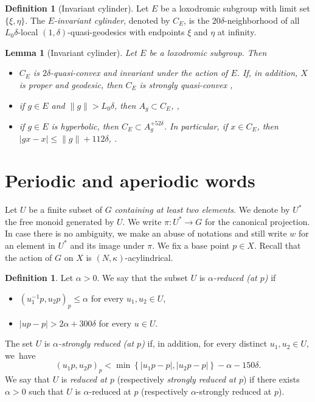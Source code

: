 \documentclass[11pt]{article}
\theoremstyle{plain}
\newtheorem{lem}[thm]{Lemma}
\theoremstyle{definition}
\newtheorem{df}[thm]{Definition}
\begin{document}
\begin{df}[Invariant cylinder] Let $E$ be a loxodromic subgroup with limit set $\{ \xi,\eta \}$. The \emph{$E$-invariant cylinder}, denoted by $C_E$, is the $20\delta$-neighborhood of all $L_0 \delta$-local $(1, \delta)$-quasi-geodesics with endpoints $\xi$ and $\eta$ at infinity.
\end{df}

\begin{lem}[Invariant cylinder]\label{L: invariant cylinder}
Let $E$ be a loxodromic subgroup. Then
\begin{itemize}
\item $C_E$ is $2\delta$-quasi-convex and invariant under the action of $E$. If, in addition, $X$ is proper and geodesic, then $C_E$ is strongly quasi-convex \cite[Lem.\,2.31]{coulon_geometry_2014},

\item if $g\in E$ and $\| g \|>L_0\delta$, then $A_g\subset C_E$, \cite[Lem.\,2.33]{coulon_geometry_2014},

\item if $g\in E$ is hyperbolic, then $C_E\subset A_g^{+ 52\delta}$. In particular, if $x\in C_E$, then $|gx-x|\leqslant \| g \| + 112 \delta $, \cite[Lem.\,2.32]{coulon_geometry_2014}.

\end{itemize}
\end{lem}

\section{Periodic and aperiodic words}
\label{sec: periodic and aperiodic words}
Let $U$ be a finite subset of $G$ \emph{containing at least two elements}.
We denote by $U^*$ the free monoid generated by $U$.
We write $\pi \colon U^* \to G$ for the canonical projection.
In case there is no ambiguity, we make an abuse of notations and still write $w$ for an element in $U^*$ and its image under $\pi$.
We fix a base point $p \in X$.
Recall that the action of $G$ on $X$ is $(N,\kappa)$-acylindrical.

\begin{df}
\label{def: reduced set}
Let $\alpha > 0$.
We say that the subset $U$ is \emph{$\alpha$-reduced (at $p$)} if
\begin{itemize}
\item $(u_1^{-1}p, u_2p)_p \leqslant \alpha$ for every $u_1, u_2 \in U$,
\item $|up - p| > 2\alpha + 300\delta$ for every $u \in U$.
\end{itemize}
The set $U$ is \emph{$\alpha$-strongly reduced (at $p$)} if, in addition, for every distinct $u_1, u_2 \in U$, we~have
\begin{equation*}
(u_1p,u_2p)_p < \min \left\{ |u_1p - p|, |u_2p - p|\right\} -\alpha - 150\delta.
\end{equation*}
We say that $U$ is \emph{reduced at $p$} (respectively \emph{strongly reduced at $p$}) if there exists $\alpha > 0$ such that $U$ is $\alpha$-reduced at $p$ (respectively $\alpha$-strongly reduced at $p$).
\end{df}
\end{document}
